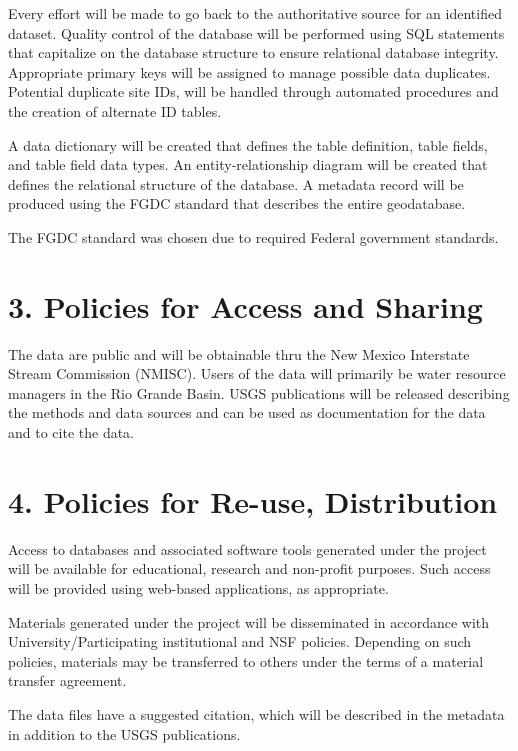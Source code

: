 \documentclass[]{article}
\begin{document}
Every effort will be made to go back to the authoritative source for an
identified dataset. Quality control of the database will be performed
using SQL statements that capitalize on the database structure to ensure
relational database integrity. Appropriate primary keys will be assigned
to manage possible data duplicates. Potential duplicate site IDs, will
be handled through automated procedures and the creation of alternate ID
tables.

A data dictionary will be created that defines the table definition,
table fields, and table field data types. An entity-relationship diagram
will be created that defines the relational structure of the database. A
metadata record will be produced using the FGDC standard that describes
the entire geodatabase.

The FGDC standard was chosen due to required Federal government
standards.

\section{3. Policies for Access and
Sharing}\label{policies-for-access-and-sharing}

The data are public and will be obtainable thru the New Mexico
Interstate Stream Commission (NMISC). Users of the data will primarily
be water resource managers in the Rio Grande Basin. USGS publications
will be released describing the methods and data sources and can be used
as documentation for the data and to cite the data.

\section{4. Policies for Re-use,
Distribution}\label{policies-for-re-use-distribution}

Access to databases and associated software tools generated under the
project will be available for educational, research and non-profit
purposes. Such access will be provided using web-based applications, as
appropriate.

Materials generated under the project will be disseminated in accordance
with University/Participating institutional and NSF policies. Depending
on such policies, materials may be transferred to others under the terms
of a material transfer agreement.

The data files have a suggested citation, which will be described in the
metadata in addition to the USGS publications.
\end{document}
